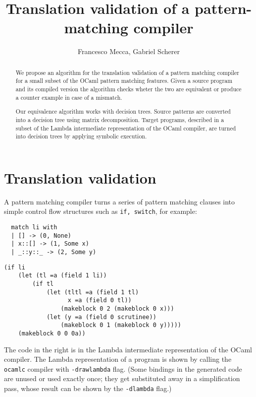 \documentclass[12pt]{article}
\title{Translation validation of a pattern-matching compiler}
\author{Francesco Mecca, Gabriel Scherer}
\begin{document}
\maketitle

\begin{abstract}
We propose an algorithm for the translation validation of a pattern
matching compiler for a small subset of the OCaml pattern
matching features. Given a source program and its compiled version the
algorithm checks wheter the two are equivalent or produce a counter
example in case of a mismatch.

Our equivalence algorithm works with decision trees. Source patterns are
converted into a decision tree using matrix decomposition.
Target programs, described in a subset of the Lambda intermediate
representation of the OCaml compiler, are turned into decision trees
by applying symbolic execution.
\end{abstract}
\section{Translation validation}
A pattern matching compiler turns a series of pattern matching clauses
into simple control flow structures such as \texttt{if, switch}, for example:

\begin{minipage}{0.3\linewidth}
\begin{lstlisting}
  match li with
  | [] -> (0, None)
  | x::[] -> (1, Some x)
  | _::y::_ -> (2, Some y)
\end{lstlisting}
\end{minipage}
\hfill
\begin{minipage}{0.7\linewidth}
\begin{lstlisting}
(if li
    (let (tl =a (field 1 li))
        (if tl
            (let (tltl =a (field 1 tl)
                  x =a (field 0 tl))
                (makeblock 0 2 (makeblock 0 x)))
            (let (y =a (field 0 scrutinee))
                (makeblock 0 1 (makeblock 0 y)))))
    (makeblock 0 0 0a))
\end{lstlisting}
\end{minipage}

The code in the right is in the Lambda intermediate representation of
the OCaml compiler. The Lambda representation of a program is shown by
calling the \texttt{ocamlc} compiler with \texttt{-drawlambda} flag.
(Some bindings in the generated code are unused or used exactly once;
they get substituted away in a simplification pass, whose result can
be shown by the \texttt{-dlambda} flag.)
\end{document}
